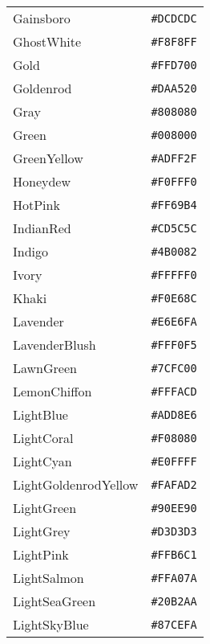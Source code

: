 \documentclass[a4paper]{article}
\begin{document}
\begin{longtable}{|l|r|}
Gainsboro & \texttt{\#DCDCDC} \cellcolor[HTML]{DCDCDC} \\
GhostWhite & \texttt{\#F8F8FF} \cellcolor[HTML]{F8F8FF} \\
Gold & \texttt{\#FFD700} \cellcolor[HTML]{FFD700} \\
Goldenrod & \texttt{\#DAA520} \cellcolor[HTML]{DAA520} \\
Gray & \texttt{\#808080} \cellcolor[HTML]{808080} \\
Green & \texttt{\#008000} \cellcolor[HTML]{008000} \\
GreenYellow & \texttt{\#ADFF2F} \cellcolor[HTML]{ADFF2F} \\
Honeydew & \texttt{\#F0FFF0} \cellcolor[HTML]{F0FFF0} \\
HotPink & \texttt{\#FF69B4} \cellcolor[HTML]{FF69B4} \\
IndianRed & \texttt{\#CD5C5C} \cellcolor[HTML]{CD5C5C} \\
Indigo & \texttt{\#4B0082} \cellcolor[HTML]{4B0082} \\
Ivory & \texttt{\#FFFFF0} \cellcolor[HTML]{FFFFF0} \\
Khaki & \texttt{\#F0E68C} \cellcolor[HTML]{F0E68C} \\
Lavender & \texttt{\#E6E6FA} \cellcolor[HTML]{E6E6FA} \\
LavenderBlush & \texttt{\#FFF0F5} \cellcolor[HTML]{FFF0F5} \\
LawnGreen & \texttt{\#7CFC00} \cellcolor[HTML]{7CFC00} \\
LemonChiffon & \texttt{\#FFFACD} \cellcolor[HTML]{FFFACD} \\
LightBlue & \texttt{\#ADD8E6} \cellcolor[HTML]{ADD8E6} \\
LightCoral & \texttt{\#F08080} \cellcolor[HTML]{F08080} \\
LightCyan & \texttt{\#E0FFFF} \cellcolor[HTML]{E0FFFF} \\
LightGoldenrodYellow & \texttt{\#FAFAD2} \cellcolor[HTML]{FAFAD2} \\
LightGreen & \texttt{\#90EE90} \cellcolor[HTML]{90EE90} \\
LightGrey & \texttt{\#D3D3D3} \cellcolor[HTML]{D3D3D3} \\
LightPink & \texttt{\#FFB6C1} \cellcolor[HTML]{FFB6C1} \\
LightSalmon & \texttt{\#FFA07A} \cellcolor[HTML]{FFA07A} \\
LightSeaGreen & \texttt{\#20B2AA} \cellcolor[HTML]{20B2AA} \\
LightSkyBlue & \texttt{\#87CEFA} \cellcolor[HTML]{87CEFA} \\

\end{longtable}
\end{document}
